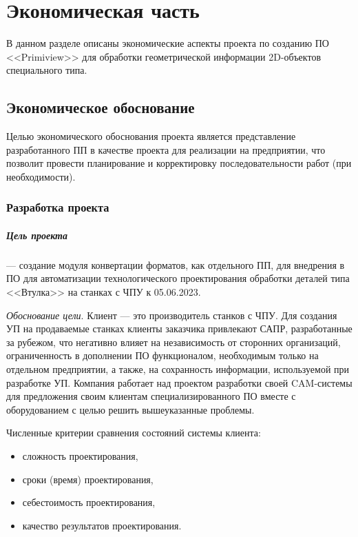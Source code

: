 \chapter{Экономическая часть}
\label{cha:economy}

В данном разделе описаны экономические аспекты проекта по созданию ПО <<Primiview>> для обработки геометрической информации 2D-объектов специального типа.

\section{Экономическое обоснование}

Целью экономического обоснования проекта является представление разработанного ПП в качестве проекта для реализации на предприятии, что позволит провести планирование и корректировку последовательности работ (при необходимости).

\subsection{Разработка проекта}

\paragraph{Цель проекта} --- создание модуля конвертации форматов, как отдельного ПП, для внедрения в ПО для автоматизации технологического проектирования обработки деталей типа <<Втулка>> на станках с ЧПУ к 05.06.2023.

\textit{Обоснование цели}. Клиент --- это производитель станков с ЧПУ. Для создания УП на продаваемые станках клиенты заказчика привлекают САПР, разработанные за рубежом, что негативно влияет на независимость от сторонних организаций, ограниченность в дополнении ПО функционалом, необходимым только на отдельном предприятии, а также, на сохранность информации, используемой при разработке УП. Компания работает над проектом разработки своей CAM-системы для предложения своим клиентам специализированного ПО вместе с оборудованием с целью решить вышеуказанные проблемы. 

Численные критерии сравнения состояний системы клиента:
\begin{itemize}
	\item сложность проектирования,
	\item сроки (время) проектирования,
	\item себестоимость проектирования,
	\item качество результатов проектирования.
\end{itemize}

